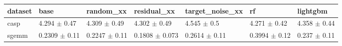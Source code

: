 \begin{tabular}{lllllll}
\toprule
dataset & base & random\_xx & residual\_xx & target\_noise\_xx & rf & lightgbm \\
\midrule
casp & 4.294 $\pm$ 0.47 & 4.309 $\pm$ 0.49 & 4.302 $\pm$ 0.49 & 4.545 $\pm$ 0.5 & 4.271 $\pm$ 0.42 & 4.358 $\pm$ 0.44 \\
sgemm & 0.2309 $\pm$ 0.11 & 0.2247 $\pm$ 0.11 & 0.1808 $\pm$ 0.073 & 0.2614 $\pm$ 0.11 & 0.3994 $\pm$ 0.12 & 0.237 $\pm$ 0.11 \\
\bottomrule
\end{tabular}
